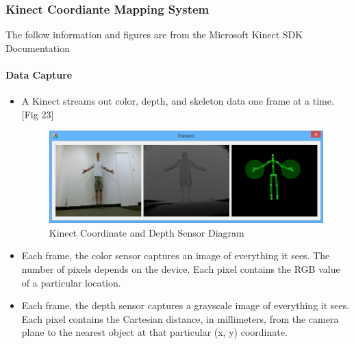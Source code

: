 \documentclass[a4paper,10pt]{article}
\begin{document}
\subsubsection{Kinect Coordiante Mapping System}
The follow information and figures are from the Microsoft Kinect SDK Documentation \cite{msdnKinect}
\paragraph{Data Capture}
\begin{itemize}

\item A Kinect streams out color, depth, and skeleton data one frame at a time. [Fig 23] 
	\begin{figure}[H]
		\centerline{\includegraphics[scale=0.6]{kinectCoord.png}}
		\caption{Kinect Coordinate and Depth Sensor Diagram}
		\label{fig:kinectCoord}
	\end{figure}

\item Each frame, the color sensor captures an image of everything it sees. The number of pixels depends on the device. Each pixel contains the RGB value of a particular location.

\item Each frame, the depth sensor captures a grayscale image of everything it sees. Each pixel contains the Cartesian distance, in millimeters, from the camera plane to the nearest 
object at that particular (x, y) coordinate.


\end{itemize}
\end{document}

